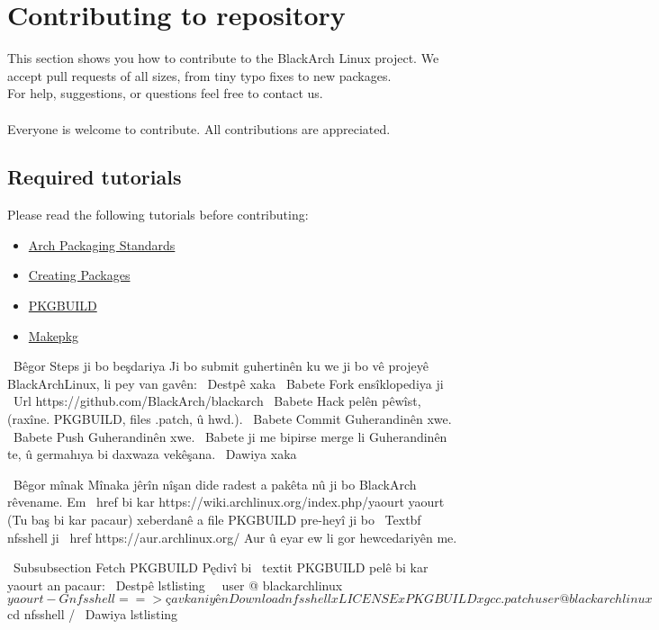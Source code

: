 \section{Contributing to repository}
This section shows you how to contribute to the BlackArch Linux project. We
accept pull requests of all sizes, from tiny typo fixes to new packages.\\For
help, suggestions, or questions feel free to contact us.
\\\\
Everyone is welcome to contribute. All contributions are appreciated.

\subsection{Required tutorials}
Please read the following tutorials before contributing:
\begin{itemize}
\item
\href{https://wiki.archlinux.org/index.php/Arch\_Packaging\_Standards)}{Arch
Packaging Standards}
\item \href{https://wiki.archlinux.org/index.php/Creating\_Packages}{Creating
Packages}
\item \href{https://wiki.archlinux.org/index.php/PKGBUILD}{PKGBUILD}
\item \href{https://wiki.archlinux.org/index.php/Makepkg}{Makepkg}
\end{itemize}

\ Bêgor {Steps ji bo beşdariya}
Ji bo submit guhertinên ku we ji bo vê projeyê BlackArchLinux, li pey van
gavên:
\ Destpê {xaka}
\ Babete Fork ensîklopediya ji
\ Url {https://github.com/BlackArch/blackarch}
\ Babete Hack pelên pêwîst, (raxîne. PKGBUILD, files .patch, û hwd.).
\ Babete Commit Guherandinên xwe.
\ Babete Push Guherandinên xwe.
\ Babete ji me bipirse merge li Guherandinên te, û germahıya bi daxwaza vekêşana.
\ Dawiya {xaka}

\ Bêgor {mînak}
Mînaka jêrîn nîşan dide radest a pakêta nû ji bo BlackArch
rêvename. Em \ href bi kar {https://wiki.archlinux.org/index.php/yaourt} {yaourt}
(Tu baş bi kar pacaur) xeberdanê a file PKGBUILD pre-heyî ji bo
\ Textbf {nfsshell} ji \ href {https://aur.archlinux.org/} {Aur} û eyar ew
li gor hewcedariyên me.

\ Subsubsection {Fetch PKGBUILD}
Pędivî bi \ textit {PKGBUILD} pelê bi kar yaourt an pacaur:
\ Destpê {lstlisting}
  user @ blackarchlinux $ yaourt -G nfsshell
  ==> çavkaniyên Download nfsshell
  x LICENSE
  x PKGBUILD
  x gcc.patch
  user @ blackarchlinux $ cd nfsshell /
\ Dawiya {lstlisting}

